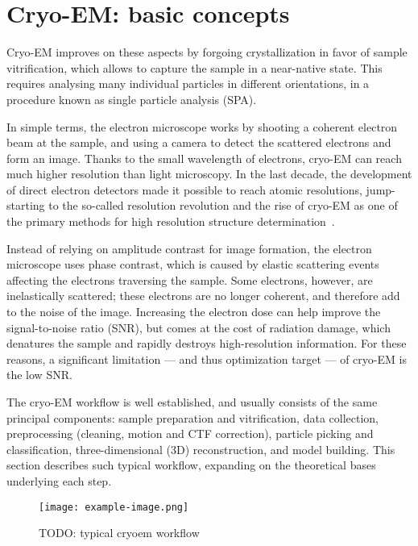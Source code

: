 
\localtableofcontents

\section{Cryo-EM: basic concepts}

Cryo-EM improves on these aspects by forgoing crystallization in favor of sample vitrification, which allows to capture the sample in a near-native state. This requires analysing many individual particles in different orientations, in a procedure known as single particle analysis (SPA).

In simple terms, the electron microscope works by shooting a coherent electron beam at the sample, and using a camera to detect the scattered electrons and form an image.
Thanks to the small wavelength of electrons, cryo-EM can reach much higher resolution than light microscopy.
In the last decade, the development of direct electron detectors made it possible to reach atomic resolutions, jump-starting to the so-called resolution revolution and the rise of cryo-EM as one of the primary methods for high resolution structure determination~\cite{faruqiCCDDetectorsHighresolution2000}.

Instead of relying on amplitude contrast for image formation, the electron microscope uses phase contrast, which is caused by elastic scattering events affecting the electrons traversing the sample.
Some electrons, however, are inelastically scattered; these electrons are no longer coherent, and therefore add to the noise of the image.
Increasing the electron dose can help improve the signal-to-noise ratio (SNR), but comes at the cost of radiation damage, which denatures the sample and rapidly destroys high-resolution information.
For these reasons, a significant limitation --- and thus optimization target --- of cryo-EM is the low SNR.

The cryo-EM workflow is well established, and usually consists of the same principal components: sample preparation and vitrification, data collection, preprocessing (cleaning, motion and CTF correction), particle picking and classification, three-dimensional (3D) reconstruction, and model building.
This section describes such typical workflow, expanding on the theoretical bases underlying each step.

\begin{figure}[ht]
    \centering
    \texttt{[image: example-image.png]}
    \caption[Cryo-EM workflow]{TODO: typical cryoem workflow}
    \label{fig:em_workflow}
\end{figure}

